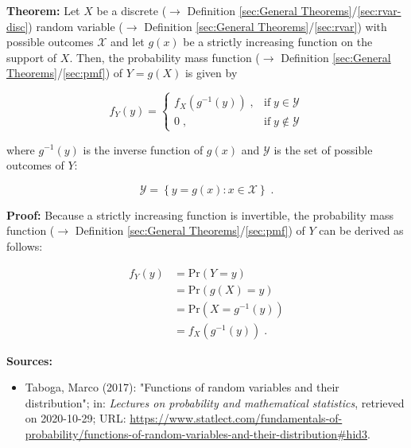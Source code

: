 \documentclass[a4paper,12pt,twoside]{book}
\begin{document}
\textbf{Theorem:} Let $X$ be a discrete ($\rightarrow$ Definition \ref{sec:General Theorems}/\ref{sec:rvar-disc}) random variable ($\rightarrow$ Definition \ref{sec:General Theorems}/\ref{sec:rvar}) with possible outcomes $\mathcal{X}$ and let $g(x)$ be a strictly increasing function on the support of $X$. Then, the probability mass function ($\rightarrow$ Definition \ref{sec:General Theorems}/\ref{sec:pmf}) of $Y = g(X)$ is given by

\begin{equation} \label{eq:pmf-sifct-pmf-sifct}
f_Y(y) = \left\{
\begin{array}{rl}
f_X(g^{-1}(y)) \; , & \text{if} \; y \in \mathcal{Y} \\
0 \; , & \text{if} \; y \notin \mathcal{Y}
\end{array}
\right.
\end{equation}

where $g^{-1}(y)$ is the inverse function of $g(x)$ and $\mathcal{Y}$ is the set of possible outcomes of $Y$:

\begin{equation} \label{eq:pmf-sifct-Y-range}
\mathcal{Y} = \left\lbrace y = g(x): x \in \mathcal{X} \right\rbrace \; .
\end{equation}


\vspace{1em}
\textbf{Proof:} Because a strictly increasing function is invertible, the probability mass function ($\rightarrow$ Definition \ref{sec:General Theorems}/\ref{sec:pmf}) of $Y$ can be derived as follows:

\begin{equation} \label{eq:pmf-sifct-pmf-sifct-qed}
\begin{split}
f_Y(y) &= \mathrm{Pr}(Y = y) \\
&= \mathrm{Pr}(g(X) = y) \\
&= \mathrm{Pr}(X = g^{-1}(y)) \\
&= f_X(g^{-1}(y)) \; .
\end{split}
\end{equation}


\vspace{1em}
\textbf{Sources:}
\begin{itemize}
\item Taboga, Marco (2017): "Functions of random variables and their distribution"; in: \textit{Lectures on probability and mathematical statistics}, retrieved on 2020-10-29; URL: \url{https://www.statlect.com/fundamentals-of-probability/functions-of-random-variables-and-their-distribution#hid3}.
\end{itemize}
\end{document}
